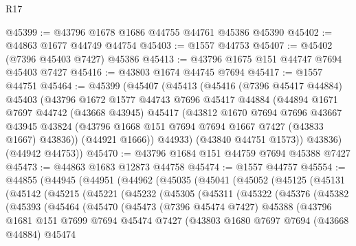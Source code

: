 \begin{lexlean}{R17}
\begin{coremodule}
@45399 := @43796 @1678 @1686 @44755 @44761 @45386 @45390
@45402 := @44863 @1677 @44749 @44754
@45403 := @1557 @44753
@45407 := @45402 (@7396 @45403 @7427) @45386
@45413 := @43796 @1675 @151 @44747 @7694 @45403 @7427
@45416 := @43803 @1674 @44745 @7694
@45417 := @1557 @44751
@45464 := @45399
    (@45407
      (@45413
        (@45416
          (@7396 @45417 @44884)
          @45403
          (@43796
            @1672
            @1577
            @44743
            @7696
            @45417
            @44884
            (@44894
              @1671
              @7697
              @44742
              (@43668 @43945)
              @45417
              (@43812
                @1670
                @7694
                @7696
                @43667
                @43945
                @43824
                (@43796 @1668 @151 @7694 @7694 @1667 @7427 (@43833 @1667) @43836))
              (@44921 @1666))
            @44933)
          (@43840 @44751 @1573))
        @43836)
      (@44942 @44753))
@45470 := @43796 @1684 @151 @44759 @7694 @45388 @7427
@45473 := @44863 @1683 @12873 @44758
@45474 := @1557 @44757
@45554 := @44855
    (@44945
      (@44951
        (@44962
          (@45035
            (@45041
              (@45052
                (@45125
                  (@45131
                    (@45142
                      (@45215
                        (@45221
                          (@45232
                            (@45305
                              (@45311
                                (@45322
                                  (@45376
                                    (@45382
                                      (@45393
                                        (@45464
                                          (@45470
                                            (@45473
                                              (@7396 @45474 @7427)
                                              @45388
                                              (@43796
                                                @1681
                                                @151
                                                @7699
                                                @7694
                                                @45474
                                                @7427
                                                (@43803
                                                  @1680
                                                  @7697
                                                  @7694
                                                  (@43668 @44884)
                                                  @45474

\end{coremodule}
\end{lexlean}
